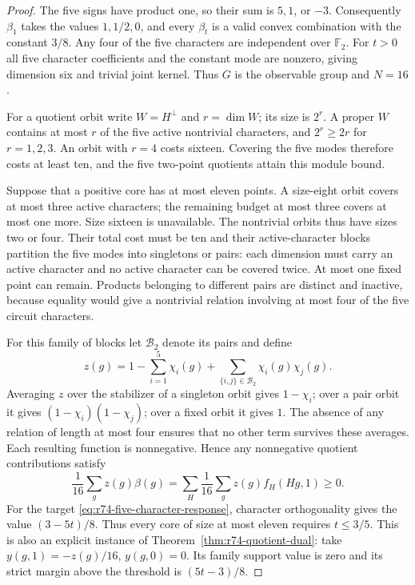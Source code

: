 \begin{proof}
The five signs have product one, so their sum is $5,1$, or $-3$.
Consequently $\beta_1$ takes the values $1,1/2,0$, and every $\beta_t$
is a valid convex combination with the constant $3/8$.
Any four of the five characters are independent over $\mathbb F_2$.
For $t>0$ all five character coefficients and the constant mode are
nonzero, giving dimension six and trivial joint kernel. Thus $G$ is the
observable group and $N=16$.

For a quotient orbit write $W=H^\perp$ and $r=\dim W$; its size is $2^r$.
A proper $W$ contains at most $r$ of the five active nontrivial characters,
and $2^r\ge2r$ for $r=1,2,3$. An orbit with $r=4$ costs sixteen.
Covering the five modes therefore costs at least ten, and the five
two-point quotients attain this module bound.

Suppose that a positive core has at most eleven points. A size-eight
orbit covers at most three active characters; the remaining budget at
most three covers at most one more. Size sixteen is unavailable.
The nontrivial orbits thus have sizes two or four. Their total cost
must be ten and their active-character blocks partition the five modes
into singletons or pairs: each dimension must carry an active character
and no active character can be covered twice. At most one fixed point
can remain. Products belonging to different pairs are distinct and
inactive, because equality would give a nontrivial relation involving
at most four of the five circuit characters.

For this family of blocks let $\mathcal B_2$ denote its pairs and define
\[
 z(g)=1-\sum_{i=1}^5\chi_i(g)
       +\sum_{\{i,j\}\in\mathcal B_2}\chi_i(g)\chi_j(g).
\]
Averaging $z$ over the stabilizer of a singleton orbit gives $1-\chi_i$;
over a pair orbit it gives $(1-\chi_i)(1-\chi_j)$; over a fixed orbit
it gives $1$. The absence of any relation of length at most four ensures
that no other term survives these averages. Each resulting function is
nonnegative. Hence any nonnegative quotient contributions satisfy
\[
 \frac1{16}\sum_gz(g)\beta(g)
 =\sum_H\frac1{16}\sum_gz(g)f_H(Hg,1)\ge0.
\]
For the target \eqref{eq:r74-five-character-response}, character
orthogonality gives the value $(3-5t)/8$. Thus every core of size at
most eleven requires $t\le3/5$. This is also an explicit instance of
Theorem~\ref{thm:r74-quotient-dual}: take
$y(g,1)=-z(g)/16$, $y(g,0)=0$. Its family support value is zero and its
strict margin above the threshold is $(5t-3)/8$.


\end{proof}
